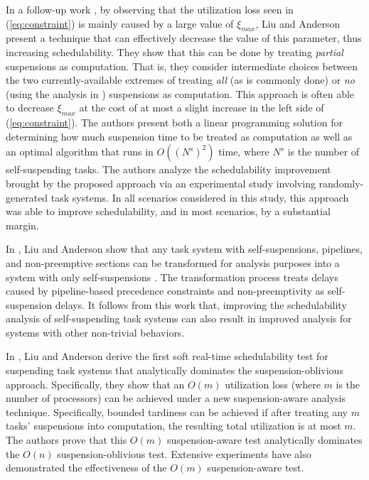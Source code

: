 In a follow-up work \cite{Liu5}, by observing that the utilization loss seen in (\ref{eq:constraint}) is mainly caused by a large value of $\xi_{max}$, Liu and Anderson present a technique that can effectively decrease the value of this parameter, thus increasing schedulability. They show that this can be done by treating \textit{partial} suspensions as computation. That is, they consider intermediate choices between the two currently-available extremes of treating \textit{all} (as is commonly done) or \textit{no} (using the analysis in \cite{Liu093}) suspensions as computation. This approach is often able to decrease $\xi_{max}$ at the cost of at most a slight increase in the left side of (\ref{eq:constraint}). The authors present both a linear programming solution for determining how much suspension time to be treated as computation as well as an optimal algorithm that runs in $O((N^s)^2)$ time, where $N^s$ is the number of self-suspending tasks. The authors analyze the schedulability improvement brought by the proposed approach via an experimental study involving randomly-generated task systems. In all scenarios considered in this study, this approach was able to improve schedulability, and in most scenarios, by a substantial margin. 

In \cite{Liu4}, Liu and Anderson  show that any task system with self-suspensions, pipelines, and
non-preemptive sections can be transformed for analysis purposes into a system with only self-suspensions \cite{Liu4}. The transformation process treats delays caused by pipeline-based precedence constraints and non-preemptivity as self-suspension delays. It follows from this work that, improving the schedulability analysis of self-suspending task systems can also result in improved analysis for systems with other non-trivial behaviors.

In \cite{Liu9,Liu11}, Liu and Anderson derive the first soft real-time schedulability test for suspending task systems that analytically dominates the suspension-oblivious approach. Specifically, they show that an $O(m)$ utilization loss (where $m$ is the number of processors) can be achieved under a new suspension-aware analysis technique. Specifically, bounded tardiness can be achieved if after treating any $m$ tasks' suspensions into computation, the resulting total utilization is at most $m$. The authors prove that this $O(m)$ suspension-aware test analytically dominates the $O(n)$ suspension-oblivious test. Extensive experiments have also demonstrated the effectiveness of the $O(m)$ suspension-aware test.
